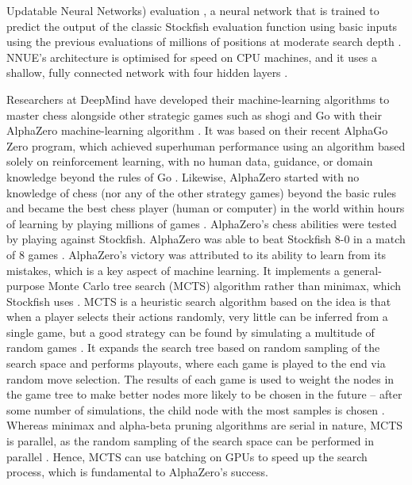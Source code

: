 \documentclass[%
 superscriptaddress,
showpacs,preprintnumbers,
 amsmath,
 amssymb,
 aps,
 pra,
showkeys,
onecolumn,
notitlepage,
11pt,
tightenlines      %
]{revtex4-1}
\begin{document}
Updatable Neural Networks) evaluation \cite{nasu2018efficiently}, a neural network that is trained to predict the output of the classic Stockfish evaluation function using basic inputs using the previous evaluations of millions of positions at moderate search depth \cite{stockfishNNUEEvaluation}. NNUE's architecture is optimised for speed on CPU machines, and it uses a shallow, fully connected network with four hidden layers \cite{guideToStockfishNNUE}.

Researchers at DeepMind have developed their machine-learning algorithms to master chess alongside other strategic games such as shogi and Go with their AlphaZero machine-learning algorithm \cite{silver2018general}. It was based on their recent AlphaGo Zero program, which achieved superhuman performance using an algorithm based solely on reinforcement learning, with no human data, guidance, or domain knowledge beyond the rules of Go \cite{silver2017mastering}. Likewise, AlphaZero started with no knowledge of chess (nor any of the other strategy games) beyond the basic rules and became the best chess player (human or computer) in the world within hours of learning by playing millions of games \cite{strogatz2018one}. AlphaZero's chess abilities were tested by playing against Stockfish. AlphaZero was able to beat Stockfish 8-0 in a match of 8 games \cite{silver2018general}. AlphaZero's victory was attributed to its ability to learn from its mistakes, which is a key aspect of machine learning. It implements a general-purpose Monte Carlo tree search (MCTS) algorithm rather than minimax, which Stockfish uses \cite{silver2017mastering2}. MCTS is a heuristic search algorithm based on the idea is that when a player selects their actions randomly, very little can be inferred from a single game, but a good strategy can be found by simulating a multitude of random games \cite{chaslot2008monte}. It expands the search tree based on random sampling of the search space and performs playouts, where each game is played to the end via random move selection. The results of each game is used to weight the nodes in the game tree to make better nodes more likely to be chosen in the future -- after some number of simulations, the child node with the most samples is chosen \cite{chaslot2008monte}. Whereas minimax and alpha-beta pruning algorithms are serial in nature, MCTS is parallel, as the random sampling of the search space can be performed in parallel \cite{silver2017mastering2}. Hence, MCTS can use batching on GPUs to speed up the search process, which is fundamental to AlphaZero's success.
\end{document}
